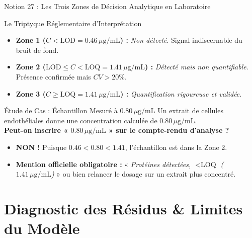 \documentclass[aspectratio=169,10pt]{beamer}
\begin{document}
\begin{frame}{Notion 27 : Les Trois Zones de Décision Analytique en Laboratoire}
  \begin{conceptbox}{Le Triptyque Réglementaire d'Interprétation}
    \footnotesize
    \begin{itemize}
      \item \textbf{Zone 1 ($C < \text{LOD} = 0.46\,\mu\text{g/mL}$) :} \textit{Non détecté}. Signal indiscernable du bruit de fond.
      \item \textbf{Zone 2 ($\text{LOD} \le C < \text{LOQ} = 1.41\,\mu\text{g/mL}$) :} \textit{Détecté mais non quantifiable}. Présence confirmée mais $CV > 20\%$.
      \item \textbf{Zone 3 ($C \ge \text{LOQ} = 1.41\,\mu\text{g/mL}$) :} \textit{Quantification rigoureuse et validée}.
    \end{itemize}
  \end{conceptbox}
  \vspace{1mm}
  \begin{warnbox}{Étude de Cas : Échantillon Mesuré à $0.80\,\mu\text{g/mL}$}
    \footnotesize
    Un extrait de cellules endothéliales donne une concentration calculée de $0.80\,\mu\text{g/mL}$.\\
    \textbf{Peut-on inscrire « $0.80\,\mu\text{g/mL}$ » sur le compte-rendu d'analyse ?}
    \begin{itemize}
      \item \textbf{NON !} Puisque $0.46 < 0.80 < 1.41$, l'échantillon est dans la Zone 2.
      \item \textbf{Mention officielle obligatoire :} « \textit{Protéines détectées, $< \text{LOQ}$ ($1.41\,\mu\text{g/mL}$)} » ou bien relancer le dosage sur un extrait plus concentré.
    \end{itemize}
  \end{warnbox}
\end{frame}

\section{Diagnostic des Résidus \& Limites du Modèle}
\end{document}
